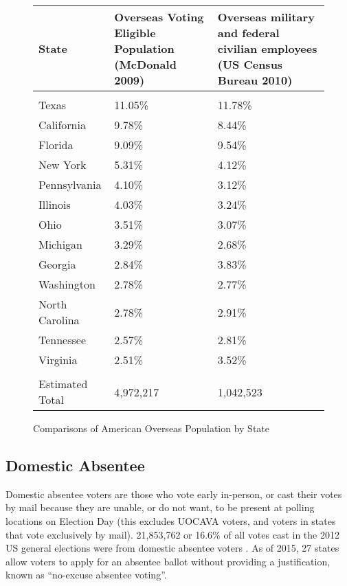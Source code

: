 
\begin{figure}
\begin{center}
\begin{tabular}{l p{} p{}} %
  {\bf State} &
  {\bf Overseas Voting Eligible \newline Population} \newline(McDonald 2009) &
  {\bf Overseas military and federal \newline civilian employees}
  \newline(US Census Bureau 2010)\\\hline\\
Texas & 11.05\% & 11.78\%\\
California & 9.78\% & 8.44\% \\
Florida & 9.09\% & 9.54\% \\
New York & 5.31\% & 4.12\% \\
Pennsylvania & 4.10\% & 3.12\% \\
Illinois & 4.03\% & 3.24\% \\
Ohio & 3.51\% & 3.07\% \\
Michigan & 3.29\% & 2.68\% \\
Georgia & 2.84\% & 3.83\% \\
Washington & 2.78\% & 2.77\% \\
North Carolina & 2.78\% & 2.91\% \\
Tennessee & 2.57\% & 2.81\% \\
Virginia & 2.51\% & 3.52\% \\\hline\\
Estimated Total & 4,972,217 & 1,042,523
\end{tabular}
\end{center}
\caption{Comparisons of American Overseas Population by State}
\label{fig:uocava_populations} %
\end{figure}

\subsection{Domestic Absentee}
Domestic absentee voters are those who vote early in-person, or cast
their votes by mail because they are unable, or do not want, to be
present at polling locations on Election Day (this excludes UOCAVA
voters, and voters in states that vote exclusively by
mail). 21,853,762 or 16.6\% of all votes cast in the 2012 US general
elections were from domestic absentee voters \cite{eac2012survey}. As
of 2015, 27 states allow voters to apply for an absentee ballot
without providing a justification, known as ``no-excuse absentee
voting''.

